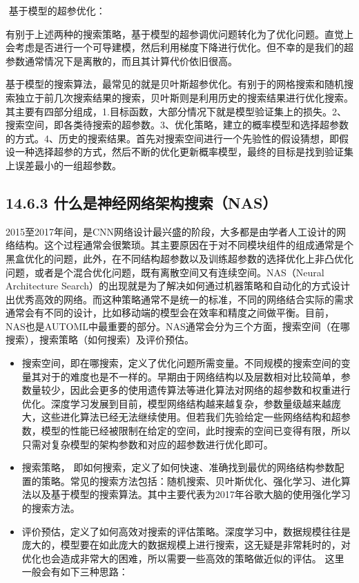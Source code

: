 ​ 基于模型的超参优化：

​
有别于上述两种的搜索策略，基于模型的超参调优问题转化为了优化问题。直觉上会考虑是否进行一个可导建模，然后利用梯度下降进行优化。但不幸的是我们的超参数通常情况下是离散的，而且其计算代价依旧很高。

​
基于模型的搜索算法，最常见的就是贝叶斯超参优化。有别于的网格搜索和随机搜索独立于前几次搜索结果的搜索，贝叶斯则是利用历史的搜索结果进行优化搜索。其主要有四部分组成，1.目标函数，大部分情况下就是模型验证集上的损失。2、搜索空间，即各类待搜索的超参数。3、优化策略，建立的概率模型和选择超参数的方式。4、历史的搜索结果。首先对搜索空间进行一个先验性的假设猜想，即假设一种选择超参的方式，然后不断的优化更新概率模型，最终的目标是找到验证集上误差最小的一组超参数。

\subsection{14.6.3
什么是神经网络架构搜索（NAS）}\label{ux4ec0ux4e48ux662fux795eux7ecfux7f51ux7edcux67b6ux6784ux641cux7d22nas}

2015至2017年间，是CNN网络设计最兴盛的阶段，大多都是由学者人工设计的网络结构。这个过程通常会很繁琐。其主要原因在于对不同模块组件的组成通常是个黑盒优化的问题，此外，在不同结构超参数以及训练超参数的选择优化上非凸优化问题，或者是个混合优化问题，既有离散空间又有连续空间。NAS（Neural
Architecture
Search）的出现就是为了解决如何通过机器策略和自动化的方式设计出优秀高效的网络。而这种策略通常不是统一的标准，不同的网络结合实际的需求通常会有不同的设计，比如移动端的模型会在效率和精度之间做平衡。目前，NAS也是AUTOML中最重要的部分。NAS通常会分为三个方面，搜索空间（在哪搜索），搜索策略（如何搜索）及评价预估。

\begin{itemize}
\item
  搜索空间，即在哪搜索，定义了优化问题所需变量。不同规模的搜索空间的变量其对于的难度也是不一样的。早期由于网络结构以及层数相对比较简单，参数量较少，因此会更多的使用遗传算法等进化算法对网络的超参数和权重进行优化。深度学习发展到目前，模型网络结构越来越复杂，参数量级越来越庞大，这些进化算法已经无法继续使用。但若我们先验给定一些网络结构和超参数，模型的性能已经被限制在给定的空间，此时搜索的空间已变得有限，所以只需对复杂模型的架构参数和对应的超参数进行优化即可。
\item
  搜索策略，
  即如何搜索，定义了如何快速、准确找到最优的网络结构参数配置的策略。常见的搜索方法包括：随机搜索、贝叶斯优化、强化学习、进化算法以及基于模型的搜索算法。其中主要代表为2017年谷歌大脑的使用强化学习的搜索方法。
\item
  评价预估，定义了如何高效对搜索的评估策略。深度学习中，数据规模往往是庞大的，模型要在如此庞大的数据规模上进行搜索，这无疑是非常耗时的，对优化也会造成非常大的困难，所以需要一些高效的策略做近似的评估。
  这里一般会有如下三种思路：
\end{itemize}

